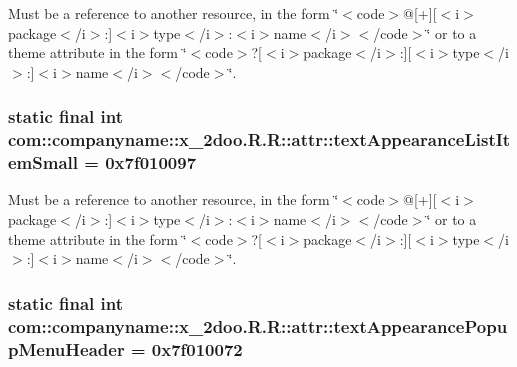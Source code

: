 Must be a reference to another resource, in the form \char`\"{}$<$code$>$@\mbox{[}+\mbox{]}\mbox{[}$<$i$>$package$<$/i$>$:\mbox{]}$<$i$>$type$<$/i$>$:$<$i$>$name$<$/i$>$$<$/code$>$\char`\"{} or to a theme attribute in the form \char`\"{}$<$code$>$?\mbox{[}$<$i$>$package$<$/i$>$:\mbox{]}\mbox{[}$<$i$>$type$<$/i$>$:\mbox{]}$<$i$>$name$<$/i$>$$<$/code$>$\char`\"{}. \hypertarget{classcom_1_1companyname_1_1x__2doo_1_1_r_1_1attr_cf18b0d5b86e48b378387a4a26f282e4}{
\subsubsection[{textAppearanceListItemSmall}]{\setlength{\rightskip}{0pt plus 5cm}static final int com::companyname::x\_\-2doo.R.R::attr::textAppearanceListItemSmall = 0x7f010097}}
\label{classcom_1_1companyname_1_1x__2doo_1_1_r_1_1attr_cf18b0d5b86e48b378387a4a26f282e4}


Must be a reference to another resource, in the form \char`\"{}$<$code$>$@\mbox{[}+\mbox{]}\mbox{[}$<$i$>$package$<$/i$>$:\mbox{]}$<$i$>$type$<$/i$>$:$<$i$>$name$<$/i$>$$<$/code$>$\char`\"{} or to a theme attribute in the form \char`\"{}$<$code$>$?\mbox{[}$<$i$>$package$<$/i$>$:\mbox{]}\mbox{[}$<$i$>$type$<$/i$>$:\mbox{]}$<$i$>$name$<$/i$>$$<$/code$>$\char`\"{}. \hypertarget{classcom_1_1companyname_1_1x__2doo_1_1_r_1_1attr_669258be6387f0b17dab897e56b622bb}{
\subsubsection[{textAppearancePopupMenuHeader}]{\setlength{\rightskip}{0pt plus 5cm}static final int com::companyname::x\_\-2doo.R.R::attr::textAppearancePopupMenuHeader = 0x7f010072}}
\label{classcom_1_1companyname_1_1x__2doo_1_1_r_1_1attr_669258be6387f0b17dab897e56b622bb}


